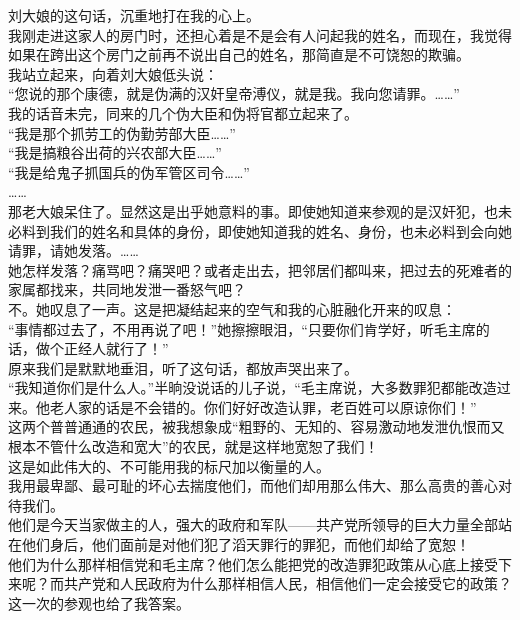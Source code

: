 刘大娘的这句话，沉重地打在我的心上。\\

我刚走进这家人的房门时，还担心着是不是会有人问起我的姓名，而现在，我觉得如果在跨出这个房门之前再不说出自己的姓名，那简直是不可饶恕的欺骗。\\

我站立起来，向着刘大娘低头说：\\

“您说的那个康德，就是伪满的汉奸皇帝溥仪，就是我。我向您请罪。……”\\

我的话音未完，同来的几个伪大臣和伪将官都立起来了。\\

“我是那个抓劳工的伪勤劳部大臣……”\\

“我是搞粮谷出荷的兴农部大臣……”\\

“我是给鬼子抓国兵的伪军管区司令……”\\

……\\

那老大娘呆住了。显然这是出乎她意料的事。即使她知道来参观的是汉奸犯，也未必料到我们的姓名和具体的身份，即使她知道我的姓名、身份，也未必料到会向她请罪，请她发落。……\\

她怎样发落？痛骂吧？痛哭吧？或者走出去，把邻居们都叫来，把过去的死难者的家属都找来，共同地发泄一番怒气吧？\\

不。她叹息了一声。这是把凝结起来的空气和我的心脏融化开来的叹息：\\

“事情都过去了，不用再说了吧！”她擦擦眼泪，“只要你们肯学好，听毛主席的话，做个正经人就行了！”\\

原来我们是默默地垂泪，听了这句话，都放声哭出来了。\\

“我知道你们是什么人。”半晌没说话的儿子说，“毛主席说，大多数罪犯都能改造过来。他老人家的话是不会错的。你们好好改造认罪，老百姓可以原谅你们！”\\

这两个普普通通的农民，被我想象成“粗野的、无知的、容易激动地发泄仇恨而又根本不管什么改造和宽大”的农民，就是这样地宽恕了我们！\\

这是如此伟大的、不可能用我的标尺加以衡量的人。\\

我用最卑鄙、最可耻的坏心去揣度他们，而他们却用那么伟大、那么高贵的善心对待我们。\\

他们是今天当家做主的人，强大的政府和军队——共产党所领导的巨大力量全部站在他们身后，他们面前是对他们犯了滔天罪行的罪犯，而他们却给了宽恕！\\

他们为什么那样相信党和毛主席？他们怎么能把党的改造罪犯政策从心底上接受下来呢？而共产党和人民政府为什么那样相信人民，相信他们一定会接受它的政策？\\

这一次的参观也给了我答案。